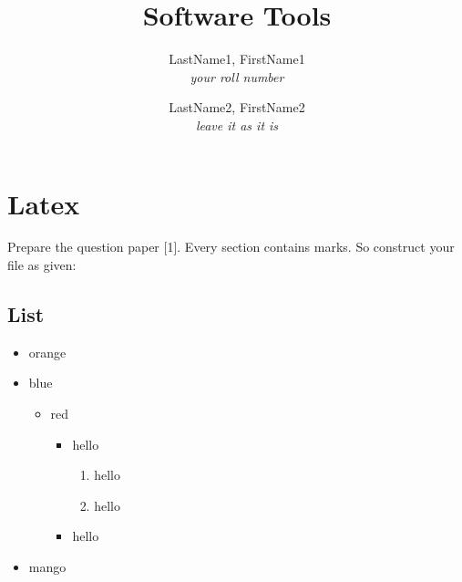 \documentclass[12pt]{article}
\title{Software Tools}
\author{LastName1, FirstName1\\ \textit{your roll number}

\and LastName2, FirstName2\\ \textit{leave it as it is}}
\begin{document}
\maketitle



\section{Latex}

Prepare the question paper [1]. Every section contains marks. So construct your file as given:



\subsection{List}

\begin{itemize}

    \item orange

    \item blue

          \begin{itemize}

              \item red

                    \begin{itemize}

                        \item hello

                              \begin{enumerate}

                                  \item hello

                                  \item hello

                              \end{enumerate}

                        \item hello

                    \end{itemize}

          \end{itemize}

    \item mango

\end{itemize}
\end{document}
